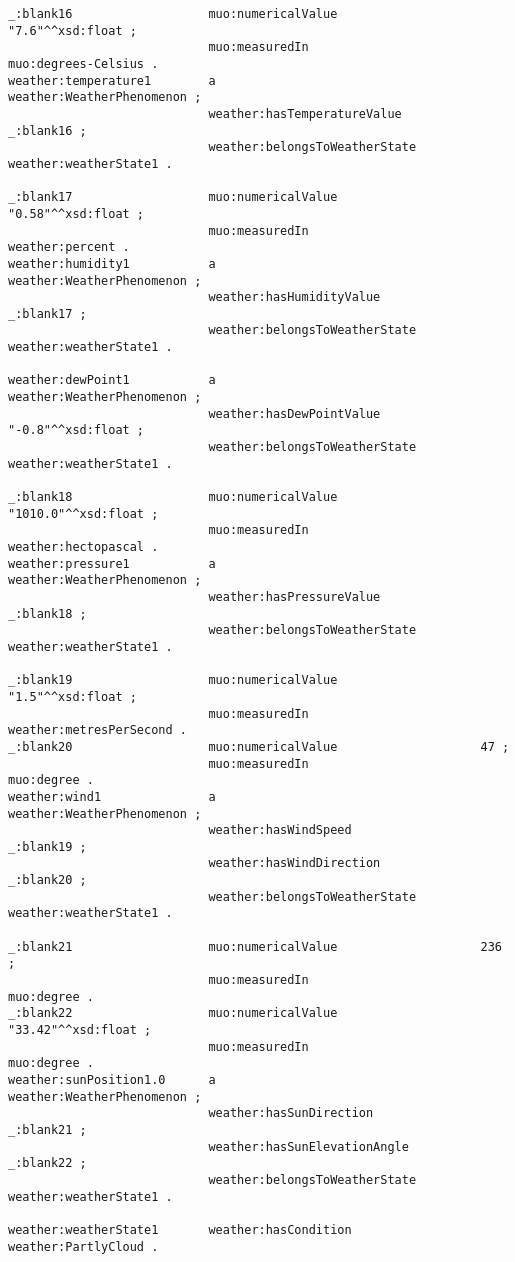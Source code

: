 \begin{lstlisting}
_:blank16                   muo:numericalValue                    "7.6"^^xsd:float ;
                            muo:measuredIn                        muo:degrees-Celsius .
weather:temperature1        a                                     weather:WeatherPhenomenon ;
                            weather:hasTemperatureValue           _:blank16 ;
                            weather:belongsToWeatherState         weather:weatherState1 .

_:blank17                   muo:numericalValue                    "0.58"^^xsd:float ;
                            muo:measuredIn                        weather:percent .
weather:humidity1           a                                     weather:WeatherPhenomenon ;
                            weather:hasHumidityValue              _:blank17 ;
                            weather:belongsToWeatherState         weather:weatherState1 .

weather:dewPoint1           a                                     weather:WeatherPhenomenon ;
                            weather:hasDewPointValue              "-0.8"^^xsd:float ;
                            weather:belongsToWeatherState         weather:weatherState1 .

_:blank18                   muo:numericalValue                    "1010.0"^^xsd:float ;
                            muo:measuredIn                        weather:hectopascal .
weather:pressure1           a                                     weather:WeatherPhenomenon ;
                            weather:hasPressureValue              _:blank18 ;
                            weather:belongsToWeatherState         weather:weatherState1 .

_:blank19                   muo:numericalValue                    "1.5"^^xsd:float ;
                            muo:measuredIn                        weather:metresPerSecond .
_:blank20                   muo:numericalValue                    47 ;
                            muo:measuredIn                        muo:degree .
weather:wind1               a                                     weather:WeatherPhenomenon ;
                            weather:hasWindSpeed                  _:blank19 ;
                            weather:hasWindDirection              _:blank20 ;
                            weather:belongsToWeatherState         weather:weatherState1 .

_:blank21                   muo:numericalValue                    236 ;
                            muo:measuredIn                        muo:degree .
_:blank22                   muo:numericalValue                    "33.42"^^xsd:float ;
                            muo:measuredIn                        muo:degree .
weather:sunPosition1.0      a                                     weather:WeatherPhenomenon ;
                            weather:hasSunDirection               _:blank21 ;
                            weather:hasSunElevationAngle          _:blank22 ;
                            weather:belongsToWeatherState         weather:weatherState1 .

weather:weatherState1       weather:hasCondition                  weather:PartlyCloud .
\end{lstlisting}
